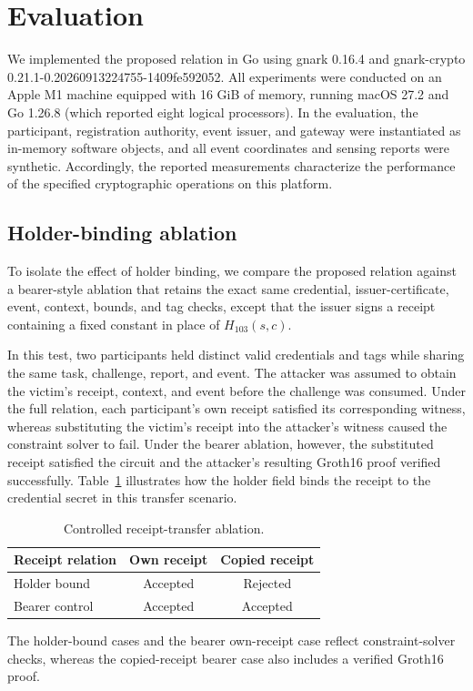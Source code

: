 \documentclass[pdflatex,iicol,sn-mathphys-num]{sn-jnl}
\begin{document}
\section{Evaluation}
\label{sec:evaluation}

We implemented the proposed relation in Go using gnark 0.16.4 and gnark-crypto 0.21.1-0.20260913224755-1409fe592052. All experiments were conducted on an Apple M1 machine equipped with 16 GiB of memory, running macOS 27.2 and Go 1.26.8 (which reported eight logical processors). In the evaluation, the participant, registration authority, event issuer, and gateway were instantiated as in-memory software objects, and all event coordinates and sensing reports were synthetic. Accordingly, the reported measurements characterize the performance of the specified cryptographic operations on this platform.

\subsection{Holder-binding ablation}
To isolate the effect of holder binding, we compare the proposed relation against a bearer-style ablation that retains the exact same credential, issuer-certificate, event, context, bounds, and tag checks, except that the issuer signs a receipt containing a fixed constant in place of $H_{103}(s,c)$.

In this test, two participants held distinct valid credentials and tags while sharing the same task, challenge, report, and event. The attacker was assumed to obtain the victim's receipt, context, and event before the challenge was consumed. Under the full relation, each participant's own receipt satisfied its corresponding witness, whereas substituting the victim's receipt into the attacker's witness caused the constraint solver to fail. Under the bearer ablation, however, the substituted receipt satisfied the circuit and the attacker's resulting Groth16 proof verified successfully. Table~\ref{tab:ablation} illustrates how the holder field binds the receipt to the credential secret in this transfer scenario.

\begin{table}[t]
\centering\caption{Controlled receipt-transfer ablation.}\label{tab:ablation}
\begin{tabular}{@{}lcc@{}}\toprule
Receipt relation & Own receipt & Copied receipt \\\midrule
Holder bound & Accepted & Rejected \\
Bearer control & Accepted & Accepted \\\bottomrule
\end{tabular}\par\vspace{2pt}
\footnotesize The holder-bound cases and the bearer own-receipt case reflect constraint-solver checks, whereas the copied-receipt bearer case also includes a verified Groth16 proof.
\end{table}
\end{document}
